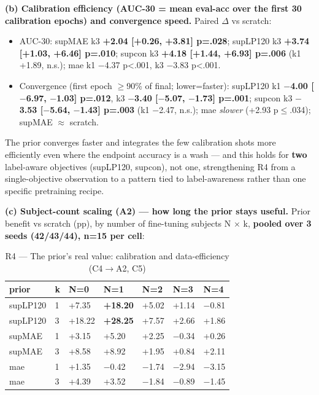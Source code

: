 \textbf{(b) Calibration efficiency (AUC-30 = mean eval-acc over the first 30 calibration epochs) and convergence speed.} Paired $\Delta$ vs scratch:

\begin{itemize}
  \item AUC-30: supMAE k3 \textbf{+2.04 [+0.26, +3.81] p=.028}; supLP120 k3 \textbf{+3.74 [+1.03, +6.46] p=.010}; supcon k3 \textbf{+4.18 [+1.44, +6.93] p=.006} (k1 +1.89, n.s.); mae k1 $-$4.37 p<.001, k3 $-$3.83 p<.001.
  \item Convergence (first epoch $\ge$90\% of final; lower=faster): supLP120 k1 \textbf{$-$4.00 [$-$6.97, $-$1.03] p=.012}, k3 \textbf{$-$3.40 [$-$5.07, $-$1.73] p=.001}; supcon k3 \textbf{$-$3.53 [$-$5.64, $-$1.43] p=.003} (k1 $-$2.47, n.s.); mae \textit{slower} (+2.93 p$\le$.034); supMAE $\approx$ scratch.
\end{itemize}

The prior converges faster and integrates the few calibration shots more efficiently even where the endpoint accuracy is a wash --- and this holds for \textbf{two} label-aware objectives (supLP120, supcon), not one, strengthening R4 from a single-objective observation to a pattern tied to label-awareness rather than one specific pretraining recipe.

\textbf{(c) Subject-count scaling (A2) --- how long the prior stays useful.} Prior benefit vs scratch (pp), by number of fine-tuning subjects N $\times$ k, \textbf{pooled over 3 seeds (42/43/44), n=15 per cell}:

\begin{table}[!t]
\centering
\caption{R4 --- The prior's real value: calibration and data-efficiency (C4$\rightarrow$A2, C5)}
\small
\begin{tabular}{lllllll}
\toprule
prior & k & N=0 & N=1 & N=2 & N=3 & N=4 \\
\midrule
supLP120 & 1 & +7.35 & \textbf{+18.20} & +5.02 & +1.14 & $-$0.81 \\
supLP120 & 3 & +18.22 & \textbf{+28.25} & +7.57 & +2.66 & +1.86 \\
supMAE & 1 & +3.15 & +5.20 & +2.25 & $-$0.34 & +0.26 \\
supMAE & 3 & +8.58 & +8.92 & +1.95 & +0.84 & +2.11 \\
mae & 1 & +1.35 & $-$0.42 & $-$1.74 & $-$2.94 & $-$3.15 \\
mae & 3 & +4.39 & +3.52 & $-$1.84 & $-$0.89 & $-$1.45 \\
\bottomrule
\end{tabular}
\end{table}

